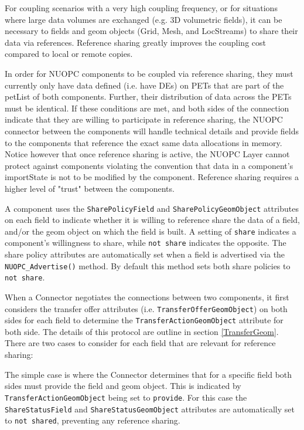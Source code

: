 %

\label{Sharing}

For coupling scenarios with a very high coupling frequency, or for situations where large data volumes are exchanged (e.g. 3D volumetric fields), it can be necessary to fields and geom objects (Grid, Mesh, and LocStreams) to share their data via references. Reference sharing greatly improves the coupling cost compared to local or remote copies.

In order for NUOPC components to be coupled via reference sharing, they must currently only have data defined (i.e. have DEs) on PETs that are part of the petList of both components. Further, their distribution of data across the PETs must be identical. If these conditions are met, and both sides of the connection indicate that they are willing to participate in reference sharing, the NUOPC connector between the components will handle technical details and provide fields to the components that reference the exact same data allocations in memory. Notice however that once reference sharing is active, the NUOPC Layer cannot protect against components violating the convention that data in a component's importState is not to be modified by the component. Reference sharing requires a higher level of "trust" between the components.

A component uses the {\tt SharePolicyField} and {\tt SharePolicyGeomObject} attributes on each field to indicate whether it is willing to reference share the data of a field, and/or the geom object on which the field is built. A setting of {\tt share} indicates a component's willingness to share, while {\tt not share} indicates the opposite. The share policy attributes are automatically set when a field is advertised via the {\tt NUOPC\_Advertise()} method. By default this method sets both share policies to {\tt not share}.

When a Connector negotiates the connections between two components, it first considers the transfer offer attributes (i.e. {\tt TransferOfferGeomObject}) on both sides for each field to determine the {\tt TransferActionGeomObject} attribute for both side. The details of this protocol are outline in section \ref{TransferGeom}. There are two cases to consider for each field that are relevant for reference sharing:

The simple case is where the Connector determines that for a specific field both sides must provide the field and geom object. This is indicated by {\tt TransferActionGeomObject} being set to {\tt provide}. For this case the {\tt ShareStatusField} and {\tt ShareStatusGeomObject} attributes are automatically set to {\tt not shared}, preventing any reference sharing.

